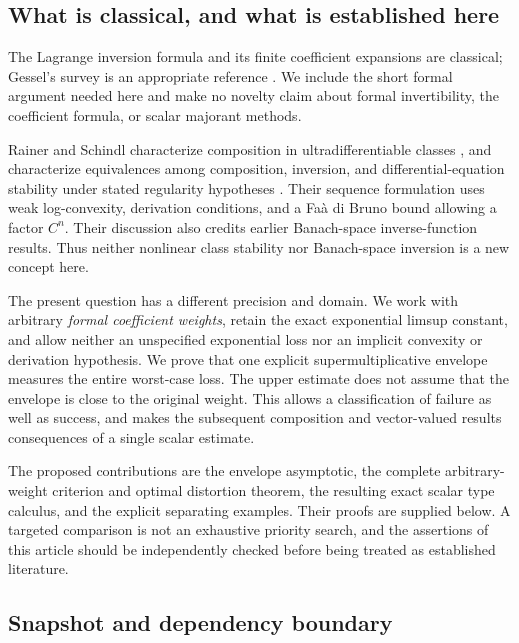 \documentclass[11pt,a4paper]{article}
\numberwithin{equation}{section}
\theoremstyle{definition}
\theoremstyle{remark}
\begin{document}
\subsection{What is classical, and what is established here}

The Lagrange inversion formula and its finite coefficient expansions are
classical; Gessel's survey is an appropriate reference \cite{gessel}.
We include the short formal argument needed here and make no novelty
claim about formal invertibility, the coefficient formula, or scalar
majorant methods.

Rainer and Schindl characterize composition in ultradifferentiable
classes \cite{rs-composition}, and characterize equivalences among
composition, inversion, and differential-equation stability under stated
regularity hypotheses \cite{rs-stability}. Their sequence formulation
uses weak log-convexity, derivation conditions, and a Fa\`a di Bruno bound
allowing a factor $C^n$. Their discussion also credits earlier
Banach-space inverse-function results. Thus neither nonlinear class
stability nor Banach-space inversion is a new concept here.

The present question has a different precision and domain. We work with
arbitrary \emph{formal coefficient weights}, retain the exact exponential
limsup constant, and allow neither an unspecified exponential loss nor
an implicit convexity or derivation hypothesis. We prove that one
explicit supermultiplicative envelope measures the entire worst-case
loss. The upper estimate does not assume that the envelope is close to
the original weight. This allows a classification of failure as well as
success, and makes the subsequent composition and vector-valued results
consequences of a single scalar estimate.

The proposed contributions are the envelope asymptotic, the complete
arbitrary-weight criterion and optimal distortion theorem, the resulting
exact scalar type calculus, and the explicit separating examples.
Their proofs are supplied below. A targeted comparison is not an
exhaustive priority search, and the assertions of this article should be
independently checked before being treated as established literature.

\subsection{Snapshot and dependency boundary}
\end{document}
